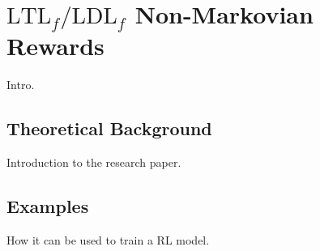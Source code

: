 \section{$\text{LTL}_f/\text{LDL}_f$ Non-Markovian Rewards}
Intro.

\subsection{Theoretical Background}
Introduction to the research paper.

\subsection{Examples}
How it can be used to train a RL model.

